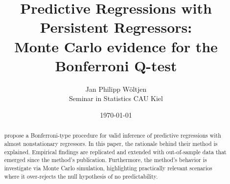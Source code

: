 \documentclass{article}
\title{Predictive Regressions with Persistent Regressors:\\ Monte Carlo evidence for the Bonferroni Q-test}
\author{Jan Philipp Wöltjen  \\
	Seminar in Statistics CAU Kiel  \\
	}
\date{\today}
\begin{document}
\maketitle


\begin{abstract}
\citet{campbell2006efficient} propose a Bonferroni-type procedure for valid inference of predictive regressions with almost nonstationary regressors. In this paper, the rationale behind their method is explained. Empirical findings are replicated and extended with out-of-sample data that emerged since the method's publication. Furthermore, the method's behavior is investigate via Monte Carlo simulation, highlighting practically relevant scenarios where it over-rejects the null hypothesis of no predictability. 
\end{abstract}
\end{document}
